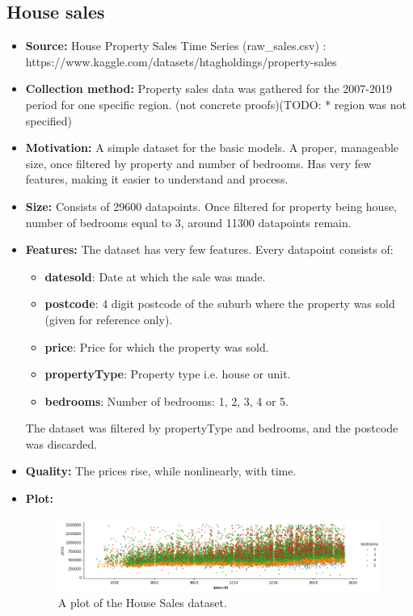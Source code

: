 \subsection{House sales}
\begin{itemize}
	\item \textbf{Source:} House Property Sales Time Series (raw\_sales.csv) :\\ https://www.kaggle.com/datasets/htagholdings/property-sales
	\item \textbf{Collection method:} Property sales data was gathered for the 2007-2019 period for one specific region. (not concrete proofs)(TODO: * region was not specified)
	\item \textbf{Motivation:} A simple dataset for the basic models. A proper, manageable size, once filtered by property and number of bedrooms. Has very few features, making it easier to understand and process.
	\item \textbf{Size:} Consists of 29600 datapoints. Once filtered for property being house, number of bedrooms equal to 3, around 11300 datapoints remain.
	\item \textbf{Features:} The dataset has very few features. Every datapoint consists of:
	      \begin{itemize}
		      \item \textbf{datesold}: Date at which the sale was made.
		      \item \textbf{postcode}: 4 digit postcode of the suburb where the property was sold (given for reference only).
		      \item \textbf{price}: Price for which the property was sold.
		      \item \textbf{propertyType}: Property type i.e. house or unit.
		      \item \textbf{bedrooms}: Number of bedrooms: 1, 2, 3, 4 or 5.
	      \end{itemize}
	      The dataset was filtered by propertyType and bedrooms, and the postcode was discarded.

	\item \textbf{Quality:} The prices rise, while nonlinearly, with time.

	\item \textbf{Plot:}
	      \begin{figure}[h!]
		      \includegraphics[width=\linewidth]{"pictures/house_sales_graph.png"}
		      \caption{A plot of the House Sales dataset.}
		      \label{fig:house_sales_graph}
	      \end{figure}
\end{itemize}
